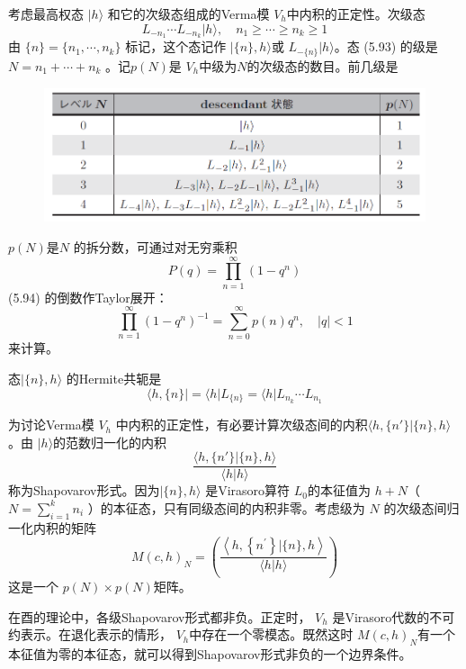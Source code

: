 考虑最高权态 $|h\rangle$ 和它的次级态组成的Verma模 $V_h $中内积的正定性。次级态
\begin{equation}
	L_{-n_1}\cdots L_{-n_k}|h\rangle,\quad n_1\geq\cdots \geq n_k\geq 1
\end{equation}
由 $\{n\}=\{n_1,\cdots ,n_k\}$ 标记，这个态记作 $|\{n\},h\rangle $或 $L_{-\{n\}}|h\rangle $。态 (5.93) 的级是$ N=n_1+\cdots+n_k$ 。记$ p(N) $是 $V_h $中级为$ N $的次级态的数目。前几级是
\begin{figure}[h]
	\centering
	\includegraphics[width=0.6\linewidth]{fig/5.2notag.png}
\end{figure}

$p(N) $是$ N$ 的拆分数，可通过对无穷乘积
\begin{equation}
	P(q)=\prod_{n=1}^{\infty}\left(1-q^{n}\right)
\end{equation}
\quad \quad (5.94)
的倒数作Taylor展开：
\begin{equation}
	\prod_{n=1}^{\infty}\left(1-q^{n}\right)^{-1}=\sum_{n=0}^{\infty} p(n) q^{n}, \quad|q|<1
\end{equation}
来计算。

态$ |\{n\},h\rangle$ 的Hermite共轭是
\begin{equation}
	\langle h,\{n\}|=\langle h| L_{\{n\}}=\langle h| L_{n_{k}} \cdots L_{n_{1}}
\end{equation}

为讨论Verma模 $V_h$ 中内积的正定性，有必要计算次级态间的内积$ \langle h,\{n'\}|\{n\},h\rangle $。由 $|h\rangle $的范数归一化的内积
$$
\frac{\langle h,\{n'\}|\{n\},h\rangle}{\langle h|h\rangle}
$$
称为Shapovarov形式。因为$ |\{n\},h\rangle$ 是Virasoro算符 $L_0 $的本征值为 $h+N $（ $N=\sum_{i=1}^{k} n_{i}$ ）的本征态，只有同级态间的内积非零。考虑级为 $N$ 的次级态间归一化内积的矩阵
\begin{equation}
	M(c, h)_{N}=\left(\frac{\left\langle h,\left\{n^{\prime}\right\} |\{n\}, h\right\rangle}{\langle h | h\rangle}\right)
\end{equation}
这是一个 $p(N)\times p(N) $矩阵。

在酉的理论中，各级Shapovarov形式都非负。正定时， $V_h$ 是Virasoro代数的不可约表示。在退化表示的情形， $V_h $中存在一个零模态。既然这时 $M(c, h)_{N} $有一个本征值为零的本征态，就可以得到Shapovarov形式非负的一个边界条件。

